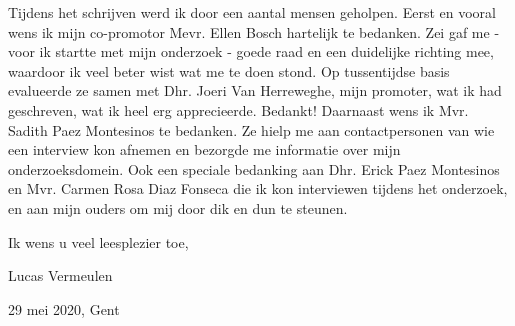 Tijdens het schrijven werd ik door een aantal mensen geholpen. Eerst en vooral wens ik mijn co-promotor Mevr. Ellen Bosch hartelijk te bedanken. Zei gaf me - voor ik startte met mijn onderzoek - goede raad en een duidelijke richting mee, waardoor ik veel beter wist wat me te doen stond. Op tussentijdse basis evalueerde ze samen met Dhr. Joeri Van Herreweghe, mijn promoter, wat ik had geschreven, wat ik heel erg apprecieerde. Bedankt! Daarnaast wens ik Mvr. Sadith Paez Montesinos te bedanken. Ze hielp me aan contactpersonen van wie een interview kon afnemen en bezorgde me informatie over mijn onderzoeksdomein. Ook een speciale bedanking aan Dhr. Erick Paez Montesinos en Mvr. Carmen Rosa Diaz Fonseca die ik kon interviewen tijdens het onderzoek, en aan mijn ouders om mij door dik en dun te steunen.

Ik wens u veel leesplezier toe,

Lucas Vermeulen

29 mei 2020, Gent